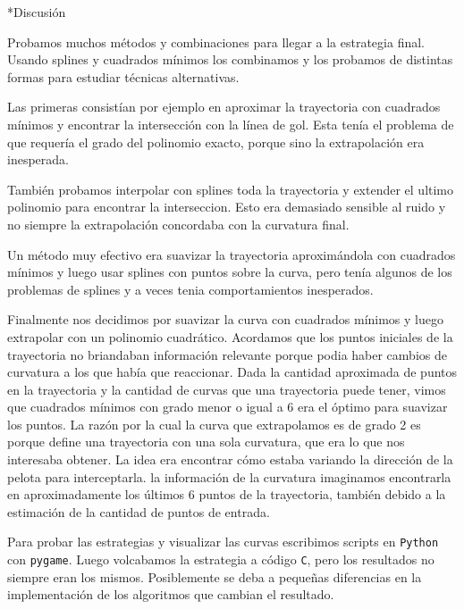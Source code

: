 \documentclass[12pt,titlepage]{article}
\newenvironment{usection}[1]{\newpage\begin{section}*{#1}	\addcontentsline{toc}{section}{#1}}{\end{section}}
\begin{document}
	
	\begin{usection}{Discusión}
		Probamos muchos métodos y combinaciones para llegar a la estrategia final.
		Usando splines y cuadrados mínimos los combinamos y los probamos de distintas formas para estudiar técnicas alternativas.
		
		Las primeras consistían por ejemplo en aproximar la trayectoria con cuadrados mínimos y encontrar la intersección con la línea de gol.
		Esta tenía el problema de que requería el grado del polinomio exacto, porque sino la extrapolación era inesperada.
		
		También probamos interpolar con splines toda la trayectoria y extender el ultimo polinomio para encontrar la interseccion.
		Esto era demasiado sensible al ruido y no siempre la extrapolación concordaba con la curvatura final.
		
		Un método muy efectivo era suavizar la trayectoria aproximándola con cuadrados mínimos y luego usar splines con puntos sobre la curva,
		pero tenía algunos de los problemas de splines y a veces tenia comportamientos inesperados.
		
		Finalmente nos decidimos por suavizar la curva con cuadrados mínimos y luego extrapolar con un polinomio cuadrático.
		Acordamos que los puntos iniciales de la trayectoria no briandaban información relevante porque podia haber cambios de curvatura a los que había que reaccionar.
		Dada la cantidad aproximada de puntos en la trayectoria y la cantidad de curvas que una trayectoria puede tener, vimos que cuadrados mínimos con grado menor o igual a 6 era el óptimo para suavizar los puntos.
		La razón por la cual la curva que extrapolamos es de grado 2 es porque define una trayectoria con una sola curvatura, que era lo que nos interesaba obtener.
		La idea era encontrar cómo estaba variando la dirección de la pelota para interceptarla.
		la información de la curvatura imaginamos encontrarla en aproximadamente los últimos 6 puntos de la trayectoria, también debido a la estimación de la cantidad de puntos de entrada.
		
		Para probar las estrategias y visualizar las curvas escribimos scripts en \texttt{Python} con \texttt{pygame}.
		Luego volcabamos la estrategia a código \texttt{C}, pero los resultados no siempre eran los mismos.
		Posiblemente se deba a pequeñas diferencias en la implementación de los algoritmos que cambian el resultado.
	\end{usection}
	
\end{document}
